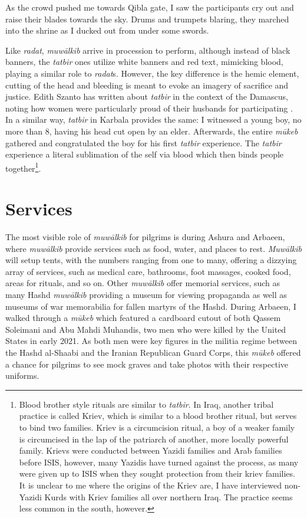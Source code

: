 As the crowd pushed me towards Qibla gate, I saw the participants cry out and raise their blades towards the sky. Drums and trumpets blaring, they marched into the shrine as I ducked out from under some swords.

Like \emph{radat}, \emph{muwālkib} arrive in procession to perform, although instead of black banners, the \emph{tatbir} ones utilize white banners and red text, mimicking blood, playing a similar role to \emph{radat}s. However, the key difference is the hemic element, cutting of the head and bleeding is meant to evoke an imagery of sacrifice and justice. Edith Szanto has written about \emph{tatbir} in the context of the Damascus, noting how women were particularly proud of their husbands for participating \cite[86]{szanto_beyond_2013}. In a similar way, \emph{tatbir} in Karbala provides the same: I witnessed a young boy, no more than 8, having his head cut open by an elder. Afterwards, the entire \emph{mūkeb} gathered and congratulated the boy for his first \emph{tatbir} experience. The \emph{tatbir} experience a literal sublimation of the self via blood which then binds people together\footnote{Blood brother style rituals are similar to \emph{tatbir}. In Iraq, another tribal practice is called Kriev, which is similar to a blood brother ritual, but serves to bind two families. Kriev is a circumcision ritual, a boy of a weaker family is circumcised in the lap of the patriarch of another, more locally powerful family. Krievs were conducted between Yazidi families and Arab families before ISIS, however, many Yazidis have turned against the process, as many were given up to ISIS when they sought protection from their kriev families. It is unclear to me where the origins of the Kriev are, I have interviewed non-Yazidi Kurds with Kriev families all over northern Iraq. The practice seems less common in the south, however.}. 

\section{Services}
The most visible role of \emph{muwālkib} for pilgrims is during Ashura and Arbaeen, where \emph{muwālkib} provide services such as food, water, and places to rest. \emph{Muwālkib} will setup tents, with the numbers ranging from one to many, offering a dizzying array of services, such as medical care, bathrooms, foot massages, cooked food, areas for rituals, and so on. Other \emph{muwālkib} offer memorial services, such as many Hashd \emph{muwālkib} providing a museum for viewing propaganda as well as museums of war memorabilia for fallen martyrs of the Hashd. During Arbaeen, I walked through a \emph{mūkeb} which featured a cardboard cutout of both Qassem Soleimani and Abu Mahdi Muhandis, two men who were killed by the United States in early 2021. As both men were key figures in the militia regime between the Hashd al-Shaabi and the Iranian Republican Guard Corps, this \emph{mūkeb} offered a chance for pilgrims to see mock graves and take photos with their respective uniforms. 

